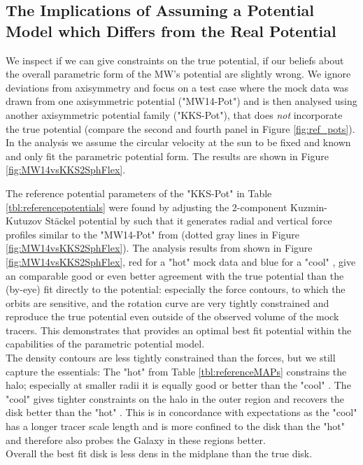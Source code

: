 \subsection{The Implications of Assuming a Potential Model which Differs from the Real Potential} \label{sec:results_potential}


We inspect if we can give constraints on the true potential, if our beliefs about the overall parametric form of the MW's potential are slightly wrong. We ignore deviations from axisymmetry and focus on a test case where the mock data was drawn from one axisymmetric potential ("MW14-Pot") and is then analysed using another axisymmetric potential family ("KKS-Pot"), that does \emph{not} incorporate the true potential (compare the second and fourth panel in Figure \ref{fig:ref_pots}). In the analysis we assume the circular velocity at the sun to be fixed and known and only fit the parametric potential form. The results are shown in Figure \ref{fig:MW14vsKKS2SphFlex}.





The reference potential parameters of the "KKS-Pot" in Table \ref{tbl:referencepotentials} were found by adjusting the 2-component Kuzmin-Kutuzov St\"{a}ckel potential by \citet{bat94} such that it generates radial and vertical force profiles similar to the "MW14-Pot" from \citet{bov15} (dotted gray lines in Figure \ref{fig:MW14vsKKS2SphFlex}). The analysis results from \RM shown in Figure \ref{fig:MW14vsKKS2SphFlex}, red for a "hot" mock data \MAP and blue for a "cool" \MAP, give an comparable good or even better agreement with the true potential than the (by-eye) fit directly to the potential: especially the force contours, to which the orbits are sensitive, and the rotation curve are very tightly constrained and reproduce the true potential even outside of the observed volume of the mock tracers. This demonstrates that \RM provides an optimal best fit potential within the capabilities of the parametric potential model.
\\The density contours are less tightly constrained than the forces, but we still capture the essentials: The "hot" \MAP from Table \ref{tbl:referenceMAPs} constrains the halo; especially at smaller radii it is equally good or better than the "cool" \MAP. The "cool" \MAP gives tighter constraints on the halo in the outer region and recovers the disk better than the "hot" \MAP. This is in concordance with expectations as the "cool" \MAP has a longer tracer scale length and is more confined to the disk than the "hot" \MAP and therefore also probes the Galaxy in these regions better.
\\Overall the best fit disk is less dens in the midplane than the true disk. 

